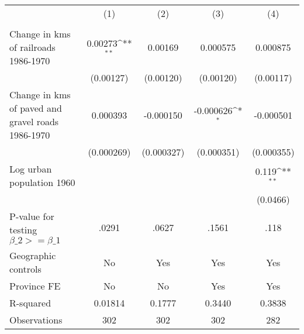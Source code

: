 {
\def\sym#1{\ifmmode^{#1}\else\(^{#1}\)\fi}
\begin{tabular}{l*{4}{c}}
\hline\hline
                &\multicolumn{1}{c}{(1)}&\multicolumn{1}{c}{(2)}&\multicolumn{1}{c}{(3)}&\multicolumn{1}{c}{(4)}\\
                &\multicolumn{1}{c}{}&\multicolumn{1}{c}{}&\multicolumn{1}{c}{}&\multicolumn{1}{c}{}\\
\hline
Change in kms of railroads 1986-1970&  0.00273\sym{**} &  0.00169         & 0.000575         & 0.000875         \\
                &(0.00127)         &(0.00120)         &(0.00120)         &(0.00117)         \\
[1em]
Change in kms of paved and gravel roads 1986-1970& 0.000393         &-0.000150         &-0.000626\sym{*}  &-0.000501         \\
                &(0.000269)         &(0.000327)         &(0.000351)         &(0.000355)         \\
[1em]
Log urban population 1960&                  &                  &                  &    0.119\sym{**} \\
                &                  &                  &                  & (0.0466)         \\
\hline
P-value for testing $\beta\_{2} >= \beta\_{1}$&    .0291         &    .0627         &    .1561         &     .118         \\
Geographic controls&       No         &      Yes         &      Yes         &      Yes         \\
Province FE     &       No         &       No         &      Yes         &      Yes         \\
R-squared       &  0.01814         &   0.1777         &   0.3440         &   0.3838         \\
Observations    &      302         &      302         &      302         &      282         \\
\hline\hline
\end{tabular}
}
